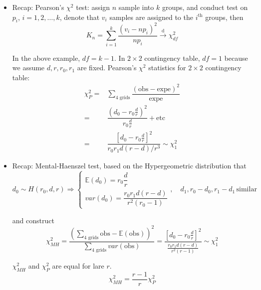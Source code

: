 \begin{itemize}[topsep=2pt,itemsep=0pt]
    \item Recap: Pearson's $ \chi^2 $ test: assign $ n $ sample into $ k $ groups, and conduct test on $ p_i $, $ i=1,2,\ldots,k $, denote that $ v_i $ samples are assigned to the $ i^\mathrm{th}  $ groups, then
    \begin{equation}
        K_n=\sum_{i=1}^k\dfrac{(v_i-np_i)^2}{np_i}\xrightarrow[]{\mathrm{d}} \chi^2_{df}
    \end{equation}

    In the above example, $ df=k-1 $. In $ 2\times 2 $ contingency table, $ df=1 $ because we assume $ d,r,r_0,r_1 $ are fixed. Pearson's $ \chi^2 $ statistics for $ 2\times 2 $ contingency table:
    \begin{align}
        \chi^2_P=&\sum_{4\text{ grids}}\dfrac{(\mathrm{obs}-\mathrm{expe})^2}{\mathrm{expe} }\\
        =&\dfrac{(d_0-r_0\frac{d}{r})^2}{r_0\frac{d}{r}}+\mathrm{etc}\\
        =&\dfrac{\left[ d_0-r_0\frac{d}{r} \right]^2}{r_0r_1d(r-d)\big/ r^3} \sim \chi^2_1
    \end{align}
    \item Recap: Mental-Haenszel test, based on the Hypergeometric distribution that 
    \begin{equation}
        d_0 \sim H(r_0,d,r)\Rightarrow \begin{cases}
            \mathbb{E}\left( d_0 \right)= r_0\dfrac{d}{r}\\
            var(d_0)=\dfrac{r_0r_1d(r-d)}{r^2(r_0-1)}
        \end{cases} ,\quad d_1,r_0-d_0,r_1-d_1 \,\mathrm{similar} 
    \end{equation}

    and construct
    \begin{equation}
        \chi^2_{MH}=\dfrac{\left(\sum_{4\text{ grids}}\mathrm{obs}-\mathbb{E}\left( \mathrm{obs}  \right)\right)^2  }{\sum_{4\text{ grids}} var(\mathrm{obs} )}=\dfrac{\left[ d_0-r_0\frac{d}{r} \right]^2}{\frac{r_0r_1d(r-d)}{r^2(r-1)}}\sim \chi^2_1
    \end{equation}
        
    $ \chi^2_{{MH}} $ and $ \chi^2_{P} $ are equal for lare $ r $.
    \begin{equation}
        \chi^2_{MH}=\dfrac{r-1}{r}\chi^2_P 
    \end{equation}


\end{itemize}
